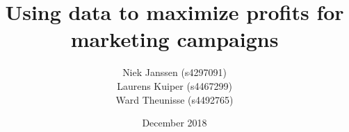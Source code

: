 \documentclass[11pt,]{article}
\date{}
\begin{document}

\setcounter{secnumdepth}{1}

\setlength{\parindent}{0cm}

\setlength{\parskip}{1em}


\let\Begin\begin

\let\End\end

\title{Using data to maximize profits for marketing campaigns}
\author{Niek Janssen (s4297091) \\ Laurens Kuiper (s4467299) \\ Ward Theunisse (s4492765)}
\date{December 2018}

\maketitleru[   course={Bayesian networks},
                righttextheader={We can add some text here:},
                righttext={But only if we want}]
\end{document}
